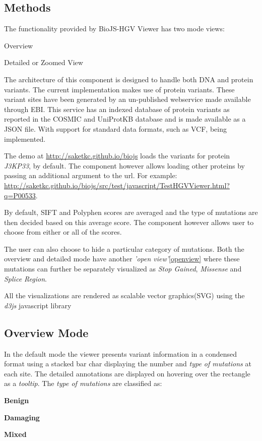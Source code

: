 \documentclass[twoside]{article}
\begin{document}
\begin{multicols}{2}
\section{Methods}
The functionality provided by BioJS-HGV Viewer has two mode views:
\begin{compactitem}
\item Overview
\item Detailed or Zoomed View
\end{compactitem}
The architecture of this component is designed to handle both DNA and protein variants. The current implementation makes use of protein variants. These variant sites have been generated by an un-published webservice made available through EBI. This service has an indexed database of protein variants as reported in the COSMIC and UniProtKB\cite{Wu2006} database and is made available as a JSON\cite{json} file. With support for standard data formats, such as VCF,\cite{vcf} being implemented.



The demo at \url{http://saketkc.github.io/biojs} loads the variants for protein \textit{J3KP33}, by default. The component however allows loading other proteins by passing an additional argument to the url. For example: \url{http://saketkc.github.io/biojs/src/test/javascript/TestHGVViewer.html?q=P00533}.

By default, SIFT and Polyphen scores are averaged and the type of mutations are then decided based on this average score. The component however allows user to choose from either or all of the scores.

The user can also choose to hide a particular category of mutations. Both the overview and detailed mode have another \textit{'open view'}\ref{openview} where these mutations can further be separately visualized as \textit{Stop Gained}, \textit{Missense} and \textit{Splice Region}.

All the visualizations are rendered as scalable vector graphics(SVG) using the \textit{d3js}\cite{d3js} javascript library


\subsection{Overview Mode}
In the default mode the viewer presents variant information in a condensed format using a stacked bar char displaying the number and \textit{type of mutations} at each site. The detailed annotations are displayed on hovering over the rectangle as a \textit{tooltip}.
The \textit{type of mutations} are classified as:
\begin{compactitem}
\item \textbf{Benign} %
\item \textbf{Damaging} %
\item \textbf{Mixed}
\end{compactitem}


\end{multicols}
\end{document}
